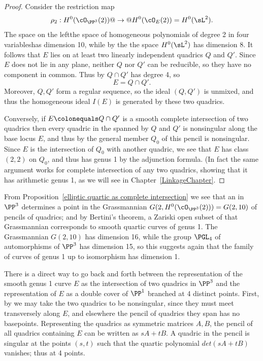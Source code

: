 \begin{proof}
Consider the restriction map
$$
\rho_2  : H^0(\cO_{\PP^3}(2)) @ \to @ H^0(\cO_{E}(2)) = H^0(\sL^2).
$$
The space on the left\emdash the space of homogeneous polynomials of
degree 2 in four variables\emdash has dimension 10, while by the 
%
the space $H^0(\sL^2)$ has dimension 8. It follows that $E$ lies on at least two linearly independent quadrics $Q$ and $Q'$. Since $E$ does not lie in any plane, neither $Q$ nor $Q'$ can be reducible, so they have no component in common.
Thus by 
%
$Q \cap Q' $ has degree 4, so
$$
E =Q \cap Q'.
$$
%
Moreover, $Q,Q'$ form a regular sequence, so the ideal $(Q,Q')$ is unmixed, and thus the homogeneous ideal $I(E)$ is generated by
these two quadrics. 

Conversely, if $E \colonequals Q\cap Q'$ is a smooth complete intersection of
two quadrics then  every quadric in the 
%
spanned by $Q$ and $Q'$ is nonsingular along the base locus $E$, and
thus by 
%
the general member $Q_0$ of this
pencil is nonsingular. Since $E$ is the intersection of $Q_0$ with another quadric, we see that $E$ has class $(2,2)$ on $Q_0$,
and thus has genus 1 by the adjunction formula. (In fact the same argument works for complete intersection of any two quadrics,
showing that it has arithmetic genus 1, as we will see in Chapter~\ref{LinkageChapter}.
\end{proof}

From Proposition~\ref{elliptic quartic as complete intersection} 
we see that an 
%
in $\PP^3$
determines a point in the Grassmannian 
%
$G(2, H^0(\cO_{\PP^3}(2))) =
G(2, 10)$ of pencils of quadrics; and by Bertini's theorem, a Zariski
open subset of that Grassmannian corresponds to smooth quartic curves
of genus 1. The Grassmannian $G(2,10)$ has dimension 16, while the
group $\PGL_4$ of automorphisms of $\PP^3$ has dimension 15, so this
suggests again that the family of curves of genus 1 up to isomorphism
has dimension 1.

There is a direct way to go back and forth between the representation of the smooth genus 1 curve $E$ as the intersection of two quadrics in $\PP^3$ and the representation of $E$ as a double cover
of $\PP^1$ branched at 4 distinct points. First, by 
%
we may take the two quadrics to be nonsingular, since they must meet
transversely along $E$, and elsewhere the
pencil of quadrics they span has no basepoints. Representing the quadrics as symmetric matrices $A,B$, the pencil of all quadrics containing $E$ can be 
written as $sA+tB$. A quadric in the pencil is singular at the points $(s,t)$ such that the quartic polynomial $det(sA+tB)$ vanishes; thus at 4 points.

